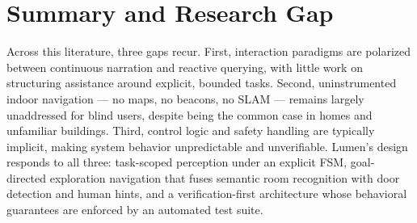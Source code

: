 \section{Summary and Research Gap}

Across this literature, three gaps recur. First, interaction paradigms are polarized
between continuous narration and reactive querying, with little work on structuring
assistance around explicit, bounded tasks. Second, uninstrumented indoor navigation
--- no maps, no beacons, no SLAM --- remains largely unaddressed for blind users,
despite being the common case in homes and unfamiliar buildings. Third, control
logic and safety handling are typically implicit, making system behavior unpredictable
and unverifiable. Lumen's design responds to all three: task-scoped perception under
an explicit FSM, goal-directed exploration navigation that fuses semantic room
recognition with door detection and human hints, and a verification-first
architecture whose behavioral guarantees are enforced by an automated test suite.